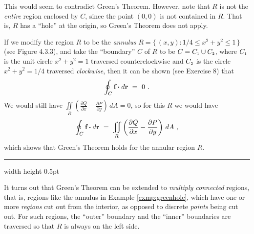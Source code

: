 This would seem to contradict Green's Theorem. However, note that $R$ is not the \emph{entire} region enclosed by $C$,
since the point $(0,0)$ is not contained in $R$. That is, $R$ has a ``hole'' at the origin, so Green's Theorem does not
apply.

If we modify the region $R$ to be the \emph{annulus} $R =\lbrace\,(x,y): 1/4 \le x^2 + y^2 \le 1\,\rbrace$ (see
Figure 4.3.3), and take the ``boundary'' $C$ of $R$ to be $C = C_{\scriptscriptstyle 1} \cup C_{\scriptscriptstyle 2}$,
where $C_{\scriptscriptstyle 1}$ is
the unit circle $x^2 + y^2 = 1$ traversed counterclockwise and $C_{\scriptscriptstyle 2}$ is the circle $x^2 + y^2 = 1/4$
traversed \emph{clockwise}, then it can be shown (see Exercise 8) that
\begin{displaymath}
 \oint_{C} \textbf{f} \bm{\cdot} d\textbf{r} ~=~ 0 ~.
\end{displaymath}
We would still have $\iint\limits_{R} \left( \frac{\partial Q}{\partial x} - \frac{\partial P}{\partial y} \right)\,dA
= 0$, so for this $R$ we would have
\begin{displaymath}
 \oint_{C} \textbf{f} \bm{\cdot} d\textbf{r} ~=~
 \iint\limits_{R} \left( \frac{\partial Q}{\partial x} - \frac{\partial P}{\partial y} \right)\,dA ~,
\end{displaymath}
which shows that Green's Theorem holds for the annular region $R$.\medskip
\hrule width \textwidth height 0.5pt
\medskip

It turns out that Green's Theorem can be extended to \emph{multiply connected} regions, that is, regions like
the annulus in Example \ref{exmp:greenhole}, which have one or more \emph{regions} cut out from the interior, as
opposed to discrete \emph{points} being cut out. For such
regions, the ``outer'' boundary and the ``inner'' boundaries are traversed so that $R$ is always on the left
side.

